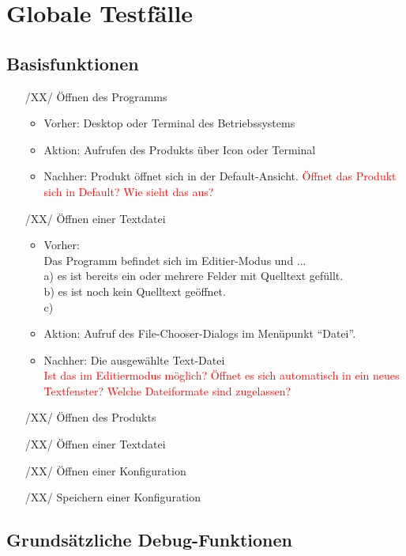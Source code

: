 \documentclass[parskip=full]{scrartcl}
\newcommand\frage[1]{\textcolor{red}{#1}}
\begin{document}
\section{Globale Testfälle}

\subsection{Basisfunktionen}

\begin{itemize}
	\item[/XX/] Öffnen des Programms
	\begin{itemize}
		\item Vorher: Desktop oder Terminal des Betriebssystems
		\item Aktion: Aufrufen des Produkts über Icon oder Terminal
		\item Nachher: Produkt öffnet sich in der Default-Ansicht.
		\frage{Öffnet das Produkt sich in Default? Wie sieht das aus?}
	\end{itemize}
	
	\item[/XX/] Öffnen einer Textdatei
	\begin{itemize}
		\item Vorher: \\
		Das Programm befindet sich im Editier-Modus und ... \\
		a) es ist bereits ein oder mehrere Felder mit Quelltext gefüllt. \\
		b) es ist noch kein Quelltext geöffnet. \\
		c) 
		\item Aktion: Aufruf des File-Chooser-Dialogs im Menüpunkt \enquote{Datei}.
		\item Nachher: Die ausgewählte Text-Datei
		\\
		\frage{Ist das im Editiermodus möglich? Öffnet es sich automatisch in ein neues Textfenster? Welche Dateiformate sind zugelassen?}
	\end{itemize}	

	\item[/XX/] Öffnen des Produkts
	\item[/XX/] Öffnen einer Textdatei
	\item[/XX/] Öffnen einer Konfiguration
	\item[/XX/] Speichern einer Konfiguration
	
	\end{itemize}

\subsection{Grundsätzliche Debug-Funktionen}
\end{document}
